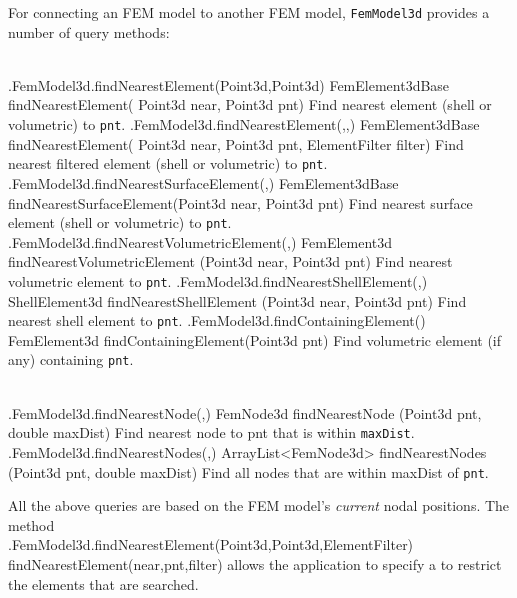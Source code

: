 For connecting an FEM model to another FEM model, {\tt FemModel3d}
provides a number of query methods:
%
%
\begin{methodtable}[4pt]{0.5}{0.5}
\midline
{}\\
\midline
%
\methodentry
{\fem.FemModel3d.findNearestElement(Point3d,Point3d)}%
{FemElement3dBase findNearestElement(\brh
  Point3d near, Point3d pnt)}%
{Find nearest element (shell or volumetric) to {\tt pnt}.}%
%
\methodentry
{\fem.FemModel3d.findNearestElement(,,)}%
{FemElement3dBase findNearestElement(\brh
  Point3d near, Point3d pnt, ElementFilter filter)}%
{Find nearest filtered element (shell or volumetric) to {\tt pnt}.}%
%
\methodentry
{\fem.FemModel3d.findNearestSurfaceElement(,)}%
{FemElement3dBase findNearestSurfaceElement(\brh Point3d near, Point3d pnt)}%
{Find nearest surface element (shell or volumetric) to {\tt pnt}.}%
%
\methodentry
{\fem.FemModel3d.findNearestVolumetricElement(,)}%
{FemElement3d findNearestVolumetricElement (\brh Point3d near, Point3d pnt)}%
{Find nearest volumetric element to {\tt pnt}.}%
%
\methodentry
{\fem.FemModel3d.findNearestShellElement(,)}%
{ShellElement3d findNearestShellElement (\brh Point3d near, Point3d pnt)}%
{Find nearest shell element to {\tt pnt}.}%
%
\methodentry
{\fem.FemModel3d.findContainingElement()}%
{FemElement3d findContainingElement(Point3d pnt)}%
{Find volumetric element (if any) containing {\tt pnt}.}%
%
\midline
\end{methodtable}

\begin{methodtable}[4pt]{0.5}{0.5}
\midline
{}\\
\midline
\methodentry
{\fem.FemModel3d.findNearestNode(,)}%
{FemNode3d findNearestNode (\brh Point3d pnt, double maxDist)}%
{Find nearest node to pnt that is within {\tt maxDist}.}%
%
\methodentry
{\fem.FemModel3d.findNearestNodes(,)}%
{ArrayList<FemNode3d> findNearestNodes (\brh Point3d pnt, double maxDist)}%
{Find all nodes that are within maxDist of {\tt pnt}.}%
%
\midline
\end{methodtable}
%

All the above queries are based on the FEM model's {\it current} nodal
positions.  The method\\
\javamethodAlt%
{\fem.FemModel3d.findNearestElement(Point3d,Point3d,ElementFilter)}%
{findNearestElement(near,pnt,filter)} allows the application to
specify
a  to
restrict the elements that are searched.

